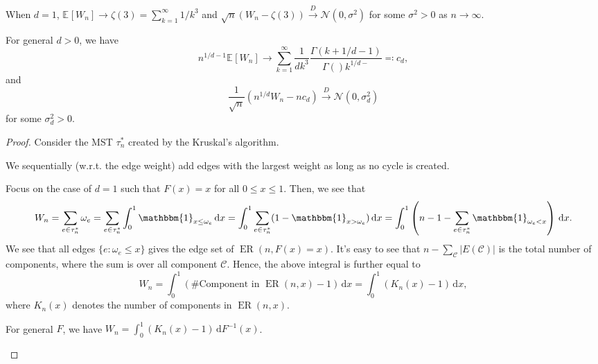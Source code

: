\begin{theorem}
	When \(d = 1\),	\(\mathbb{E}_{}[W_n] \to \zeta (3) = \sum_{k=1}^{\infty} 1 / k^3\) and \(\sqrt{n} (W_n - \zeta (3)) \overset{D}{\to} \mathcal{N} (0, \sigma ^2)\) for some \(\sigma ^2 > 0\) as \(n \to \infty \).

	For general \(d > 0\), we have
	\[
		n^{1 / d - 1} \mathbb{E}_{}[W_n]
		\to \sum_{k=1}^{\infty} \frac{1}{dk^3} \frac{\Gamma (k + 1 / d - 1)}{\Gamma () k^{1 / d - }}
		\eqqcolon c_d,
	\]
	and
	\[
		\frac{1}{\sqrt{n} } (n^{1 / d} W_n - n c_d)
		\overset{D}{\to} \mathcal{N} (0, \sigma _d^2)
	\]
	for some \(\sigma _d^2 > 0\).
\end{theorem}
\begin{proof}
	Consider the MST \(\tau _n^{\ast} \) created by the Kruskal's algorithm.

	\begin{prev}
		We sequentially (w.r.t. the edge weight) add edges with the largest weight as long as no cycle is created.
	\end{prev}

	Focus on the case of \(d = 1\) such that \(F(x) = x\) for all \(0 \leq x \leq 1\). Then, we see that
	\[
		W_n
		= \sum_{e \in \tau _n^{\ast} } \omega _e
		= \sum_{e \in \tau _n^{\ast} } \int_{0}^{1} \mathbbm{1}_{x \leq \omega _e} \,\mathrm{d}x
		= \int_{0}^{1} \sum_{e \in \tau _n^{\ast} } (1 - \mathbbm{1}_{x > \omega _e} ) \,\mathrm{d}x
		= \int_{0}^{1} \left( n-1 - \sum_{e \in \tau _n^{\ast} } \mathbbm{1}_{\omega _e < x} \right) \,\mathrm{d}x .
	\]
	We see that all edges \(\{ e \colon \omega _e \leq x \} \) gives the edge set of \(\operatorname{ER}(n, F(x) = x) \). It's easy to see that \(n - \sum_{\mathcal{C} } \lvert E(\mathcal{C} ) \rvert \) is the total number of components, where the sum is over all component \(\mathcal{C} \). Hence, the above integral is further equal to
	\[
		W_n
		= \int_{0}^{1} \left( \text{\#Component in } \operatorname{ER}(n, x) - 1 \right) \,\mathrm{d}x
		= \int_{0}^{1} (K_n(x) - 1) \,\mathrm{d}x ,
	\]
	where \(K_n(x)\) denotes the number of components in \(\operatorname{ER}(n, x) \).

	\begin{note}
		For general \(F\), we have \(W_n = \int_{0}^{1} (K_n(x) - 1) \,\mathrm{d}F^{-1} (x) \).
	\end{note}


\end{proof}

